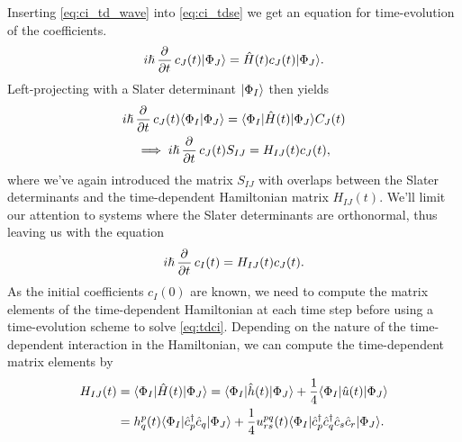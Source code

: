         Inserting \autoref{eq:ci_td_wave} into \autoref{eq:ci_tdse} we get an
        equation for time-evolution of the coefficients.
        \begin{align}
            i\hslash \dpd[]{}{t}c_{J}(t)\ket{\Phi_J}
            = \hamil(t) c_{J}(t)\ket{\Phi_J}.
        \end{align}
        Left-projecting with a Slater determinant $| \Phi_I \rangle$ then yields
        \begin{gather}
            i\hslash \dpd[]{}{t}c_{J}(t)\braket{\Phi_I}{\Phi_J}
            = \bra{\Phi_I}\hamil(t)\ket{\Phi_J} C_{J}(t) \\
            \implies
            i\hslash \dpd[]{}{t}c_{J}(t) S_{IJ}
            = H_{IJ}(t) c_{J}(t),
        \end{gather}
        where we've again introduced the matrix $S_{IJ}$ with overlaps between
        the Slater determinants and the time-dependent Hamiltonian matrix
        $H_{IJ}(t)$.
        We'll limit our attention to systems where the Slater determinants are
        orthonormal, thus leaving us with the equation
        \begin{align}
            i\hslash \dpd[]{}{t}c_{I}(t)
            = H_{IJ}(t) c_{J}(t).
            \label{eq:tdci}
        \end{align}
        As the initial coefficients $c_{I}(0)$ are known, we need to compute the
        matrix elements of the time-dependent Hamiltonian at each time step
        before using a time-evolution scheme to solve \autoref{eq:tdci}.
        Depending on the nature of the time-dependent interaction in the
        Hamiltonian, we can compute the time-dependent matrix elements by
        \begin{align}
            H_{IJ}(t)
            &= \langle \Phi_I |\hat{H}(t)| \Phi_J \rangle
            = \langle \Phi_I |\hat{h}(t)| \Phi_J \rangle
            + \frac{1}{4}\langle \Phi_I |\hat{u}(t)| \Phi_J \rangle
            \\
            &=
            h^{p}_{q}(t)
            \langle \Phi_I |\hat{c}_{p}^{\dagger}\hat{c}_{q}| \Phi_J \rangle
            + \frac{1}{4}u^{pq}_{rs}(t)
            \langle \Phi_I |\hat{c}_{p}^{\dagger}\hat{c}_{q}^{\dagger}\hat{c}_{s}\hat{c}_{r}| \Phi_J \rangle.
        \end{align}


